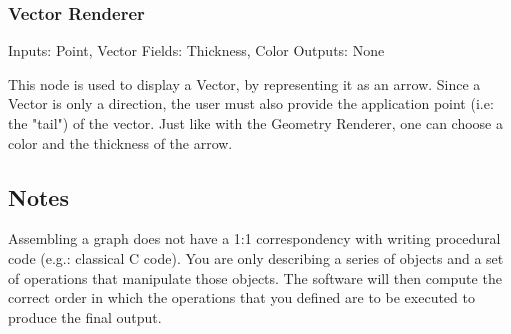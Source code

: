 \subsubsection{Vector Renderer}
Inputs: Point, Vector
Fields: Thickness, Color
Outputs: None

This node is used to display a Vector, by representing it as an arrow.
Since a Vector is only a direction, the user must also provide the application point (i.e: the "tail") of the vector.
Just like with the Geometry Renderer, one can choose a color and the thickness of the arrow.

\subsection{Notes}
Assembling a graph does not have a 1:1 correspondency with writing procedural
code (e.g.: classical C code). You are only describing a series of
objects and a set of operations that manipulate those objects. The software
will then compute the correct order in which the operations that you defined
are to be executed to produce the final output.

